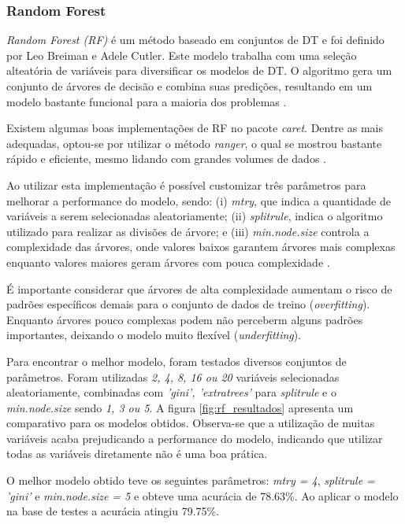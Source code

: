 \documentclass[12pt]{article}
\begin{document}
\subsubsection{Random Forest}

\textit{Random Forest (RF)} é um método baseado em conjuntos de DT e foi definido por Leo Breiman e Adele Cutler. Este modelo trabalha com uma seleção alteatória de variáveis para diversificar os modelos de DT. O algoritmo gera um conjunto de árvores de decisão e combina suas predições, resultando em um modelo bastante funcional para a maioria dos problemas \cite{lantz:mlinR, breiman:rf}.

Existem algumas boas implementações de RF no pacote \textit{caret}. Dentre as mais adequadas, optou-se por utilizar o método \textit{ranger}, o qual se mostrou bastante rápido e eficiente, mesmo lidando com grandes volumes de dados \cite{ranger:rf, caret:r}.

Ao utilizar esta implementação é possível customizar três parâmetros para melhorar a performance do modelo, sendo: (i) \textit{mtry}, que indica a quantidade de variáveis a serem selecionadas aleatoriamente; (ii) \textit{splitrule}, indica o algoritmo utilizado para realizar as divisões de árvore; e (iii) \textit{min.node.size} controla a complexidade das árvores, onde valores baixos garantem árvores mais complexas  enquanto valores maiores geram árvores com pouca complexidade .

É importante considerar que árvores de alta complexidade aumentam o risco de padrões específicos demais para o conjunto de dados de treino (\textit{overfitting}). Enquanto árvores pouco complexas podem não perceberm alguns padrões importantes, deixando o modelo muito flexível (\textit{underfitting}).

Para encontrar o melhor modelo, foram testados diversos conjuntos de parâmetros. Foram utilizadas \textit{2, 4, 8, 16 ou 20} variáveis selecionadas aleatoriamente, combinadas com \textit{'gini', 'extratrees'} para \textit{splitrule} e o \textit{min.node.size} sendo \textit{1, 3 ou 5}. A figura \ref{fig:rf_resultados} apresenta um comparativo para os modelos obtidos. Observa-se que a utilização de muitas variáveis acaba prejudicando a performance do modelo, indicando que utilizar todas as variáveis diretamente não é uma boa prática. 

O melhor modelo obtido teve os seguintes parâmetros: \textit{mtry = 4}, \textit{splitrule = 'gini'} e \textit{min.node.size = 5} e obteve uma acurácia de 78.63\%. Ao aplicar o modelo na base de testes a acurácia atingiu 79.75\%.
\end{document}
